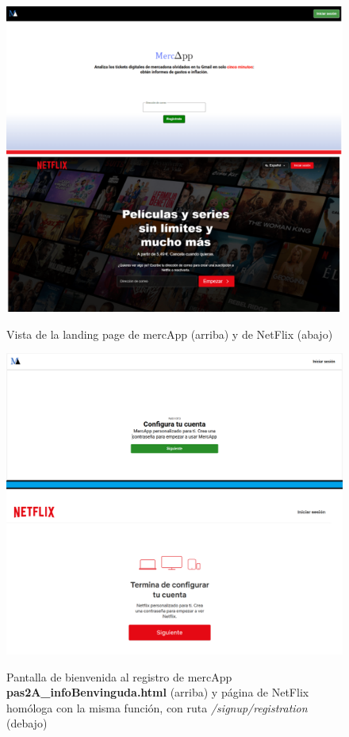 \documentclass[a4paper,12pt]{report}
\begin{document}
	\FloatBarrier
	\setlength{\belowcaptionskip}{3pt}
	\begin{figure}[H]
		\centering
		\caption{Vista de la landing page de mercApp (arriba) y de NetFlix (abajo)}
		\includegraphics[width=1\linewidth]{img/landingSignUp}
		\label{fig:landingSignUpBis}
	\end{figure}
	\FloatBarrier

	\FloatBarrier
	\setlength{\belowcaptionskip}{3pt}
	\begin{figure}[H]
		\centering
		\caption{Pantalla de bienvenida al registro de mercApp 	\textbf{pas2A\_infoBenvinguda.html} (arriba) y página de NetFlix homóloga con la misma función, con ruta \textit{/signup/registration} (debajo)}
		\includegraphics[width=1\linewidth]{img/infoBenvinguda}
		\label{fig:infoBenvinguda}
	\end{figure}
	\FloatBarrier
	
\end{document}
